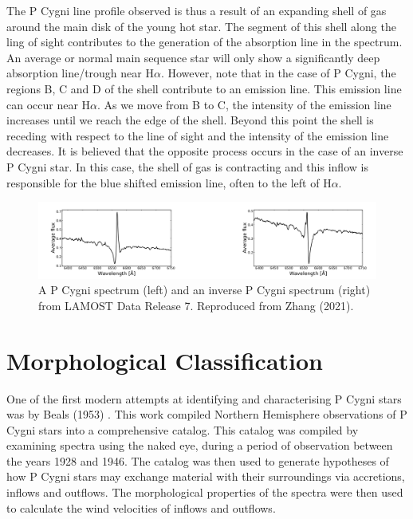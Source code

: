 The P Cygni line profile observed is thus a result of an expanding shell of gas around the main disk of the young hot star. The segment of this shell along the ling of sight contributes to the generation of the absorption line in the spectrum. An average or normal main sequence star will only show a significantly deep absorption line/trough near H$\alpha$. However, note that in the case of P Cygni, the regions B, C and D of the shell contribute to an emission line. This emission line can occur near H$\alpha$. As we move from B to C, the intensity of the emission line increases until we reach the edge of the shell. Beyond this point the shell is receding with respect to the line of sight and the intensity of the emission line decreases. It is believed that the opposite process occurs in the case of an inverse P Cygni star. In this case, the shell of gas is contracting and this inflow is responsible for the blue shifted emission line, often to the left of H$\alpha$.

\begin{figure}[h]
\centering
\includegraphics[scale=.50]{figures/p cygni and inverse p cygni.png}
\caption{A P Cygni spectrum (left) and an inverse P Cygni spectrum (right) from LAMOST Data Release 7. Reproduced from Zhang (2021)\cite{zhang2021catalog}.}
\end{figure}

\section{Morphological Classification}
One of the first modern attempts at identifying and characterising P Cygni stars was by Beals (1953) \cite{1953PDAO....9....1B}. This work compiled Northern Hemisphere observations of P Cygni stars into a comprehensive catalog. This catalog was compiled by examining spectra using the naked eye, during a period of observation between the years 1928 and 1946. The catalog was then used to generate hypotheses of how P Cygni stars may exchange material with their surroundings via accretions, inflows and outflows. The morphological properties of the spectra were then used to calculate the wind velocities of inflows and outflows. 

